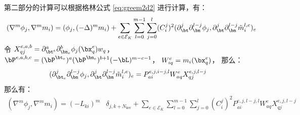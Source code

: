 第二部分的计算可以根据格林公式 \eqref{eq:greem2d2} 进行计算，有：
\begin{equation}
\begin{aligned} 
    (\nabla^m \phi_j, \nabla^m m_i) & = 
    (\phi_j, (-\Delta)^m m_i) + \sum_{e\in \mathcal{E}_K} \sum_{l=0}^{m-1}
    \sum_{j=0}^{l} (C_i^j)^2 (\partial^j_{\bt} \partial^{l-j}_{\bn} \phi_j,
    \partial^{j}_{\bt} \partial^{l-j}_{\bn} \tilde{m}^{l, e}_i)_e\\ 
\end{aligned}
\end{equation}
令 $X^{e, a, b}_{qj} = \partial_{\bt^e}^a\partial^b_{\bn_e}\phi_j(\bx_q^e) w_q$，
$\bP^{e, a, b, c} = 
(\bP^{\bt_e})^a(\bP^{\bn_e})^{b+1}
(-\bL)^{m-c-1}$，
$W^{e}_{iq} = m_i(\bx_q^e)$，
那么：
$$
\begin{aligned}
    (\partial_{\bt_e}^j\partial^{l-j}_{\bn} \phi_j,
    \partial^{j}_{\bt}\partial^{l-j}_{\bn} \tilde{m}^{l, e}_i)_e & = 
    P^{e, j, i-j,  l}_{ai} W^{e}_{aq} X^{e, j, l-j}_{qj}
\end{aligned}
$$
那么有：
$$
\begin{aligned}
    (\nabla^m \phi_j, \nabla^m m_i) = (-L_{ki})^m & \delta_{j, k+N_{\ker}} +
    \sum_{e\in \mathcal{E}_K} \sum_{l=0}^{m-1} \sum_{j=0}^{l} (C_i^j)^2
    P^{e, j, l-j, l}_{ai} W^{e}_{aq}
    X^{e, j, l-j}_{qj}
\end{aligned}
$$


